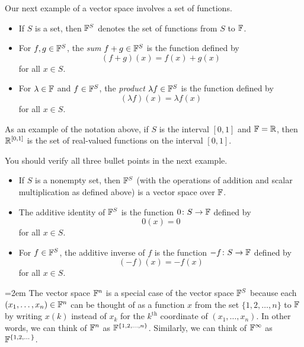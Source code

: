 Our next example of a vector space involves a set of functions.

\begin{notation}[$\F^S$]\label{ax:1.24}\leavevmode
\begin{itemize}
\item If $S$ is a set, then $\F^S$ denotes the set of functions from $S$ to
  $\mathbb{F}$.
\item For $f,g\in\mathbb{F}^S$, the \emph{sum} $f+g\in\mathbb{F}^S$ is the function defined by
  \[ (f+g)(x) = f(x)+g(x) \]
  for all $x\in S$.
\item For $\lambda\in\mathbb{F}$ and $f\in\mathbb{F}^S$, the \emph{product} $\lambda f\in\mathbb{F}^S$
  is the function defined by
  \[ (\lambda f)(x) = \lambda f(x) \]
  for all $x\in S$.
\end{itemize}
\end{notation}

As an example of the notation above, if $S$ is the interval $[0,1]$ and
$\mathbb{F}=\mathbb{R}$, then $\mathbb{R}^{[0,1]}$ is the set of real-valued functions on the interval
$[0,1]$.

You should verify all three bullet points in the next example.

\begin{example}\label{ax:1.25}\leavevmode
\begin{itemize}
\item If $S$ is a nonempty set, then $\F^S$ (with the operations of addition
  and scalar multiplication as defined above) is a vector space over $\mathbb{F}$.
\item The additive identity of $\F^S$ is the function $0\colon S\to\mathbb{F}$ defined
  by
  \[ 0(x) = 0 \]
  for all $x\in S$.
\item For $f\in\mathbb{F}^S$, the additive inverse of $f$ is the function
  $-f\colon S\to\mathbb{F}$ defined by
  \[ (-f)(x) = -f(x) \]
  for all $x\in S$.
\end{itemize}
\end{example}

%
{\emergencystretch=2em
The vector space $\mathbb{F}^n$ is a special case of the vector space $\F^S$ because
each $(x_1,\dots,x_n)\in\mathbb{F}^n$ can be thought of as a function $x$ from the set
$\{1,2,\dots,n\}$ to $\mathbb{F}$ by writing $x(k)$ instead of $x_k$ for the
$k^{\text{th}}$ coordinate of $(x_1,\dots,x_n)$. In other words, we can think
of $\mathbb{F}^n$ as $\mathbb{F}^{\{1,2,\dots,n\}}$. Similarly, we can think of $\mathbb{F}^\infty$ as
$\mathbb{F}^{\{1,2,\dots\}}$.\par}

